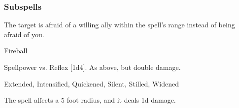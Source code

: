 \subsubsection{Subspells}
The target is afraid of a willing ally within the spell's range instead of being afraid of you.
\begin{spellsection}{Fireball}
\begin{spellheader}
\end{spellheader}
\begin{spellcontent}
\begin{spelltargetinginfo}
\end{spelltargetinginfo}
\begin{spelleffects}
\begin{spellattack}{Spellpower vs. Reflex}
\spellsuccess {}[1d4].
\spellcritical As above, but double damage.
\end{spellattack}
\end{spelleffects}
\end{spellcontent}
\begin{spellfooter}
 Extended, Intensified, Quickened, Silent, Stilled, Widened
\end{spellfooter}
\begin{spellsubcontent}
\begin{spellcantrip}
The spell affects a 5 foot radius, and it deals \minus1d damage.
\end{spellcantrip}
\end{spellsubcontent}
\end{spellsection}
